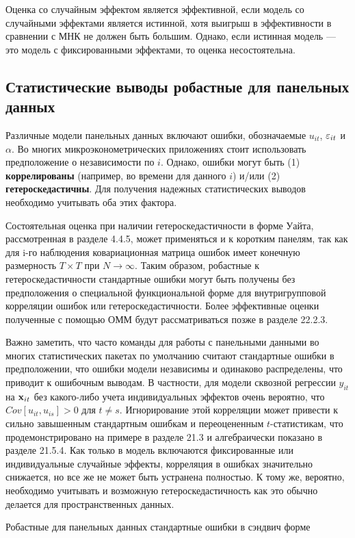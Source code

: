 Оценка со случайным эффектом является эффективной, если модель со случайными эффектами является истинной, хотя выигрыш в эффективности в сравнении с МНК не должен быть большим. Однако, если истинная модель --- это модель с фиксированными эффектами, то оценка несостоятельна.

\subsection{Статистические выводы робастные для панельных данных}
Различные модели панельных данных включают ошибки, обозначаемые $u_{it}$, $\varepsilon_{it}$ и $\alpha$. Во многих микроэконометрических приложениях стоит использовать предположение о независимости по $i$. Однако, ошибки могут быть (1) \textbf{коррелированы} (например, во времени для данного $i$) и/или (2) \textbf{гетероскедастичны}. Для получения надежных статистических выводов необходимо учитывать оба этих фактора.

Состоятельная оценка при наличии гетероскедастичности в форме Уайта, рассмотренная в разделе 4.4.5, может применяться и к коротким панелям, так как для i-го наблюдения ковариационная матрица ошибок имеет конечную размерность $T\times T$ при $N \rightarrow \infty$. Таким образом, робастные к гетероскедастичности стандартные ошибки могут быть получены без предположения о специальной функциональной форме для внутригрупповой корреляции ошибок или гетероскедастичности. Более эффективные оценки полученные с помощью ОММ будут рассматриваться позже в разделе 22.2.3. 

Важно заметить, что часто команды для работы с панельными данными во многих статистических пакетах по умолчанию считают стандартные ошибки в предположении, что ошибки модели независимы и одинаково распределены, что приводит к ошибочным выводам. В частности, для модели сквозной регрессии $y_{it}$ на $\mathbf{x}_{it}$ без какого-либо учета индивидуальных эффектов очень вероятно, что $Cov[u_{it}, u_{is}] > 0$ для $t \neq s$. Игнорирование этой корреляции может привести к сильно завышенным стандартным ошибкам и переоцененным $t$-статистикам, что продемонстрировано на примере в разделе 21.3 и алгебраически показано в разделе 21.5.4. Как только в модель включаются фиксированные или индивидуальные случайные эффекты, корреляция в ошибках значительно снижается, но все же не может быть устранена полностью.
К тому же, вероятно, необходимо учитывать и возможную гетероскедастичность как это обычно делается для пространственных данных.
 
{\centering
Робастные для панельных данных стандартные ошибки в сэндвич форме\\}

